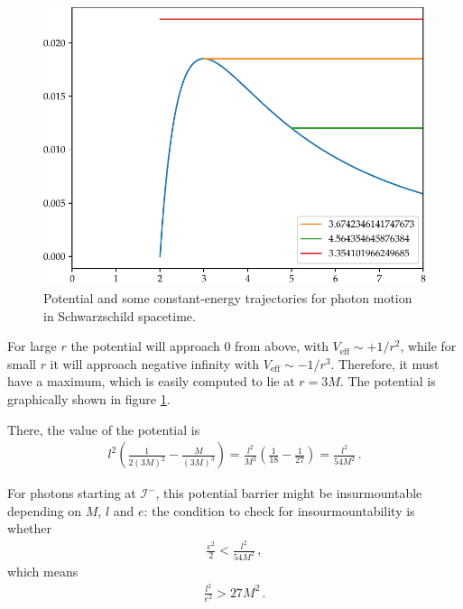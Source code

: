 \documentclass[main.tex]{subfiles}
\begin{document}
\begin{figure}[ht]
\centering
\includegraphics[width=\textwidth]{figures/effective_potential}
\caption{Potential and some constant-energy trajectories for photon motion in Schwarzschild spacetime. }
\label{fig:effective_potential}
\end{figure}
    

For large \(r\) the potential will approach 0 from above, with \( V _{\text{eff}} \sim + 1/r^2\), 
while for small \(r\) it will approach negative infinity with \( V _{\text{eff}} \sim - 1/ r^3\).
Therefore, it must have a maximum, which is easily computed to lie at \(r = 3M\). 
The potential is graphically shown in figure \ref{fig:effective_potential}.

There, the value of the potential is
%
\begin{align}
l^2 \left( \frac{1}{2 (3M)^2} - \frac{M}{(3M)^3}\right) 
= \frac{l^2}{M^2} \left( \frac{1}{18} - \frac{1}{27} \right) = \frac{l^2}{54M^2}
\,.
\end{align}
%

For photons starting at \(\mathscr{I}^-\), 
this potential barrier might be insurmountable depending on \(M\), \(l\) and \(e\): 
the condition to check for insourmountability is whether 
%
\begin{align}
\frac{e^2}{2} < \frac{l^2}{54 M^2}
\,,
\end{align}
%
which means %
\begin{align}
\frac{l^2}{e^2} > 27M^2
\,.
\end{align}
\end{document}
